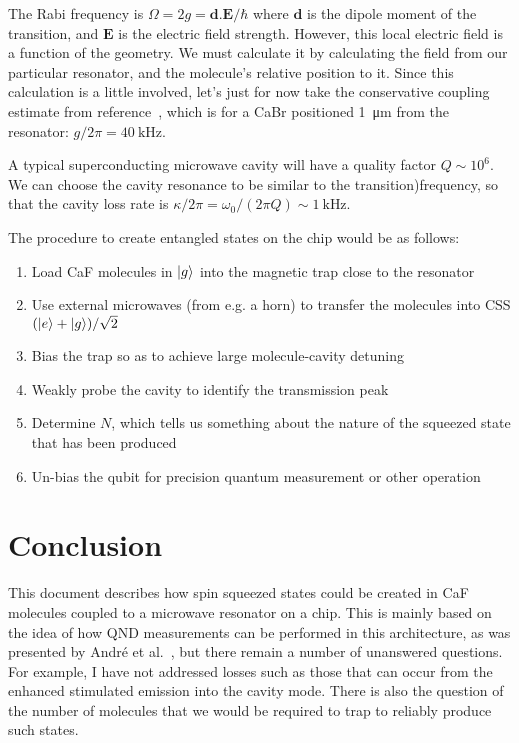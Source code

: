 \documentclass{article}
\begin{document}
The Rabi frequency is $\Omega = 2g = \mathbf{d}.\mathbf{E}/\hbar$ where $\mathbf{d}$
is the dipole moment of the transition, and $\mathbf{E}$ is the electric field
strength. However, this local electric field is a function of the geometry. We
must calculate it by calculating the field from our particular resonator, and
the molecule's relative position to it. Since this calculation is a little
involved, let's just for now take the conservative coupling estimate from
reference~\cite{Andre2006}, which is for a CaBr positioned
\SI{1}{\micro\meter} from the resonator: $g/2\pi = \SI{40}{\kilo\hertz}$.

A typical superconducting microwave cavity will have a quality factor
$Q\sim10^6$. We can choose the cavity resonance to be similar to the
transition)frequency, so that the cavity loss rate is $\kappa/2\pi =
\omega_0/(2\pi Q) \sim \SI{1}{\kilo\hertz}$. 

The procedure to create entangled states on the chip would be as follows:

\begin{enumerate}
  \item Load CaF molecules in $\ket{g}$ into the magnetic trap close to the
    resonator
  \item Use external microwaves (from e.g. a horn) to transfer the molecules
    into CSS $(\ket{e} + \ket{g})/\sqrt{2}$
  \item Bias the trap so as to achieve large molecule-cavity detuning
  \item Weakly probe the cavity to identify the transmission peak
  \item Determine $N$, which tells us something about the nature of the
    squeezed state that has been produced
  \item Un-bias the qubit for precision quantum measurement or other operation
\end{enumerate}

\section{Conclusion}

This document describes how spin squeezed states could be created in CaF
molecules coupled to a microwave resonator on a chip. This is mainly based on
the idea of how QND measurements can be performed in this architecture, as was
presented by Andr\'e et al.~\cite{Andre2006}, but there remain a number of
unanswered questions. For example, I have not addressed losses such as those
that can occur from the enhanced stimulated emission into the cavity mode.
There is also the question of the number of molecules that we would be required
to trap to reliably produce such states.
\end{document}
